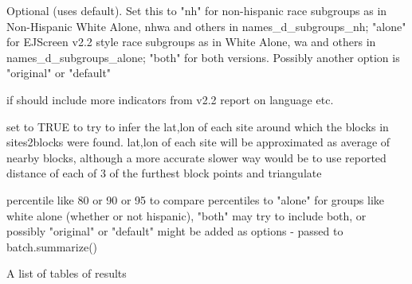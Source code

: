 \documentclass[a4paper]{book}
\begin{document}
\begin{Arguments}
\begin{ldescription}
\item[\code{subgroups\_type}] Optional (uses default). Set this to "nh" for non-hispanic race subgroups
as in Non-Hispanic White Alone, nhwa and others in names\_d\_subgroups\_nh;
"alone" for EJScreen v2.2 style race subgroups as in White Alone, wa and others in names\_d\_subgroups\_alone;
"both" for both versions. Possibly another option is "original" or "default"

\item[\code{extra\_demog}] if should include more indicators from v2.2 report on language etc.

\item[\code{infer\_sitepoints}] set to TRUE to try to infer the lat,lon of each site around which the blocks in sites2blocks were found.
lat,lon of each site will be approximated as average of nearby blocks,
although a more accurate slower way would be to use reported distance of each of 3 of the furthest block points and triangulate

\item[\code{threshold1}] percentile like 80 or 90 or 95 to compare percentiles to
"alone" for groups like white alone (whether or not hispanic),
"both" may try to include both,
or possibly "original" or "default" might be added as options - passed to batch.summarize()
\end{ldescription}
\end{Arguments}
%
\begin{Value}
A list of tables of results
\end{Value}
%
\begin{SeeAlso}\relax
{} 
\end{SeeAlso}
%
\end{document}
